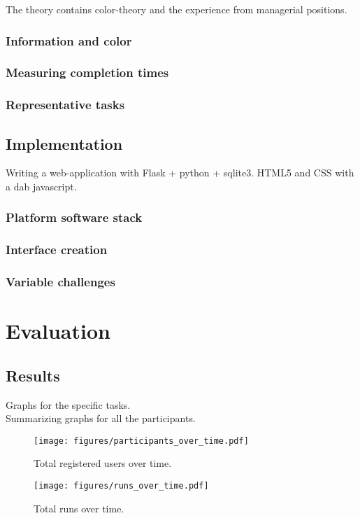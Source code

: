 \documentclass[nofilelist]{cslthse-msc}
\begin{document}
			The theory contains color-theory and the experience from managerial
			positions.

			\subsection{Information and color}

			\subsection{Measuring completion times}

			\subsection{Representative tasks}

		\section{Implementation}

			Writing a web-application with Flask + python + sqlite3.
			HTML5 and CSS with a dab javascript.

			\subsection{Platform software stack}

			\subsection{Interface creation}

			\subsection{Variable challenges}

	\chapter{Evaluation}

		\section{Results}

			Graphs for the specific tasks. \\
			Summarizing graphs for all the participants.

			\begin{figure}[!h]
				\centering
				\texttt{[image: figures/participants\_over\_time.pdf]}
				\caption{Total registered users over time.}
			\end{figure}
			\begin{figure}[!h]
				\centering
				\texttt{[image: figures/runs\_over\_time.pdf]}
				\caption{Total runs over time.}
			\end{figure}
\end{document}
